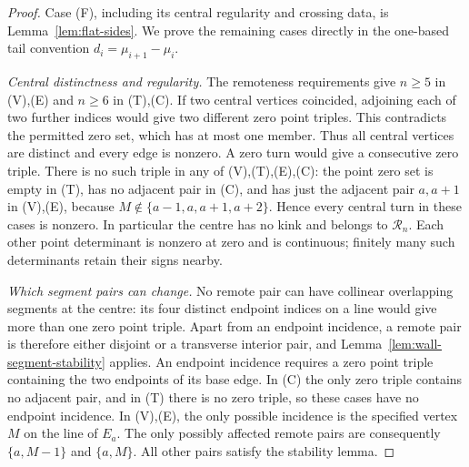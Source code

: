 \begin{proof}\leanok{}
Case (F), including its central regularity and crossing data, is
Lemma~\ref{lem:flat-sides}. We prove the remaining cases directly
in the one-based tail convention $d_i=\mu_{i+1}-\mu_i$.

\emph{Central distinctness and regularity.}
The remoteness requirements give $n\geq5$ in (V),(E) and $n\geq6$ in (T),(C).
If two central vertices coincided, adjoining each of two further indices
would give two different zero point triples. This contradicts the permitted
zero set, which has at most one member. Thus all central vertices are distinct
and every edge is nonzero. A zero turn would give a consecutive zero triple.
There is no such triple in any of (V),(T),(E),(C): the point zero set is empty
in (T), has no adjacent pair in (C), and has just the adjacent pair $a,a+1$
in (V),(E), because $M\notin\{a-1,a,a+1,a+2\}$. Hence every central turn
in these cases is nonzero. In particular the centre has no kink and belongs
to $\mathcal R_n$. Each other point determinant is nonzero at zero and is
continuous; finitely many such determinants retain their signs nearby.

\emph{Which segment pairs can change.}
No remote pair can have collinear overlapping segments at the centre: its
four distinct endpoint indices on a line would give more than one zero
point triple. Apart from an endpoint incidence, a remote pair is therefore
either disjoint or a transverse interior pair, and
Lemma~\ref{lem:wall-segment-stability} applies. An endpoint incidence requires
a zero point triple containing the two endpoints of its base edge. In (C)
the only zero triple contains no adjacent pair, and in (T) there is no zero
triple, so these cases have no endpoint incidence. In (V),(E), the only
possible incidence is the specified vertex $M$ on the line of $E_a$.
The only possibly affected remote pairs are consequently
$\{a,M-1\}$ and $\{a,M\}$. All other pairs satisfy the stability lemma.


\end{proof}
